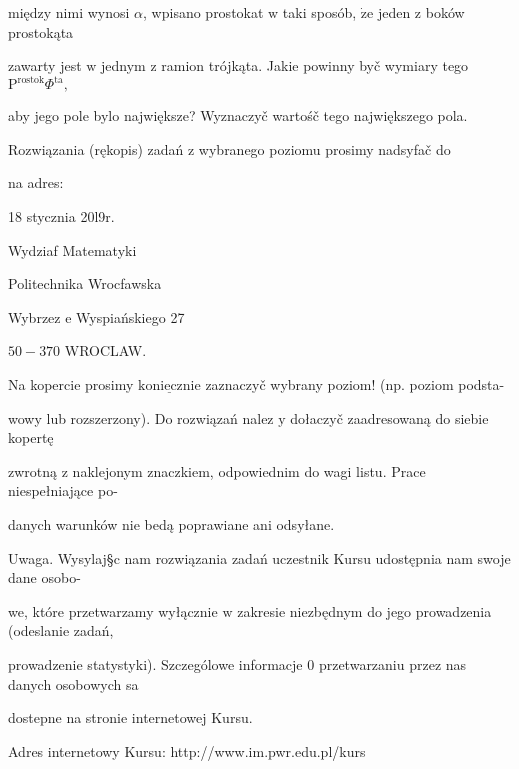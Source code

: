 \documentclass[a4paper,12pt]{article}
\begin{document}
między nimi wynosi $\alpha$, wpisano prostokat $\mathrm{w}$ taki sposób, $\dot{\mathrm{z}}\mathrm{e}$ jeden $\mathrm{z}$ boków prostokąta

zawarty jest $\mathrm{w}$ jednym $\mathrm{z}$ ramion trójkąta. Jakie powinny byč wymiary tego $\mathrm{P}^{\mathrm{r}\mathrm{o}\mathrm{s}\mathrm{t}\mathrm{o}\mathrm{k}}\Phi^{\mathrm{t}\mathrm{a}},$

aby jego pole bylo największe? Wyznaczyč wartośč tego największego pola.

Rozwiązania (rękopis) zadań z wybranego poziomu prosimy nadsyfač do

na adres:

18 stycznia 20l9r.

Wydziaf Matematyki

Politechnika Wrocfawska

Wybrzez $\mathrm{e}$ Wyspiańskiego 27

$50-370$ WROCLAW.

Na kopercie prosimy $\underline{\mathrm{k}\mathrm{o}\mathrm{n}\mathrm{i}\mathrm{e}\mathrm{c}\mathrm{z}\mathrm{n}\mathrm{i}\mathrm{e}}$ zaznaczyč wybrany poziom! (np. poziom podsta-

wowy lub rozszerzony). Do rozwiązań nalez $\mathrm{y}$ dołaczyč zaadresowaną do siebie kopertę

zwrotną $\mathrm{z}$ naklejonym znaczkiem, odpowiednim do wagi listu. Prace niespełniające po-

danych warunków nie bedą poprawiane ani odsyłane.

Uwaga. Wysylaj\S c nam rozwiązania zadań uczestnik Kursu udostępnia nam swoje dane osobo-

we, które przetwarzamy wyłącznie $\mathrm{w}$ zakresie niezbędnym do jego prowadzenia (odeslanie zadań,

prowadzenie statystyki). Szczególowe informacje $0$ przetwarzaniu przez nas danych osobowych sa

dostepne na stronie internetowej Kursu.

Adres internetowy Kursu: http://www.im.pwr.edu.pl/kurs
\end{document}
